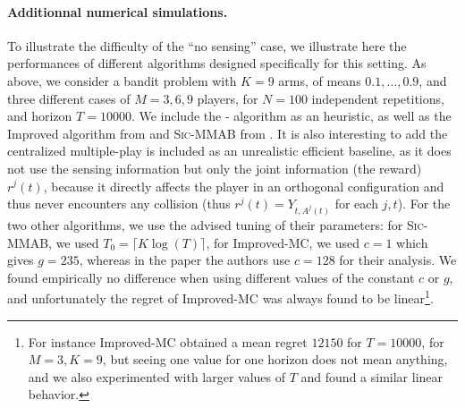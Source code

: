 \paragraph{Additionnal numerical simulations.}

To illustrate the difficulty of the ``no sensing'' case, we illustrate here the performances of different algorithms designed specifically for this setting.
As above, we consider a bandit problem with $K=9$ arms, of means $0.1,\dots,0.9$, and three different cases of $M=3,6,9$ players, for $N=100$ independent repetitions, and horizon $T=10000$.
We include the \Selfish-\klUCB{} algorithm as an heuristic, as well as the Improved \MusicalChair{} algorithm from \cite{LugosiMehrabian18} and \textsc{Sic-MMAB} from \cite{BoursierPerchet18}.
It is also interesting to add the centralized multiple-play \klUCB{} is included as an unrealistic efficient baseline, as it does not use the sensing information but only the joint information (the reward) $r^j(t)$, because it directly affects the player in an orthogonal configuration and thus never encounters any collision (thus $r^j(t)=Y_{t,A^j(t)}$ for each $j,t$).
%
For the two other algorithms, we use the advised tuning of their parameters:
for \textsc{Sic-MMAB}, we used $T_0 = \lceil K \log(T) \rceil$,
for Improved-MC, we used $c=1$ which gives $g=235$, whereas in the paper the authors use $c=128$ for their analysis.
We found empirically no difference when using different values of the constant $c$ or $g$, and unfortunately the regret of Improved-MC was always found to be linear\footnote{For instance Improved-MC obtained a mean regret $12150$ for $T=10000$, for $M=3,K=9$, but seeing one value for one horizon does not mean anything, and we also experimented with larger values of $T$ and found a similar linear behavior.}.


